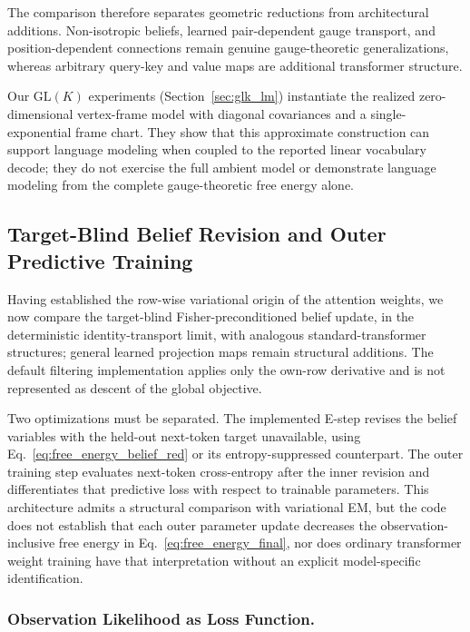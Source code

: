 \documentclass[twoside,11pt]{article}
\begin{document}
The comparison therefore separates geometric reductions from architectural additions. Non-isotropic beliefs, learned pair-dependent gauge transport, and position-dependent connections remain genuine gauge-theoretic generalizations, whereas arbitrary query-key and value maps are additional transformer structure.

Our $\mathrm{GL}(K)$ experiments (Section~\ref{sec:glk_lm}) instantiate the realized zero-dimensional vertex-frame model with diagonal covariances and a single-exponential frame chart. They show that this approximate construction can support language modeling when coupled to the reported linear vocabulary decode; they do not exercise the full ambient model or demonstrate language modeling from the complete gauge-theoretic free energy alone.

\subsection{Target-Blind Belief Revision and Outer Predictive Training}

Having established the row-wise variational origin of the attention weights, we now compare the target-blind Fisher-preconditioned belief update, in the deterministic identity-transport limit, with analogous standard-transformer structures; general learned projection maps remain structural additions. The default filtering implementation applies only the own-row derivative and is not represented as descent of the global objective.

Two optimizations must be separated. The implemented E-step revises the belief variables with the held-out next-token target unavailable, using Eq.~\eqref{eq:free_energy_belief_red} or its entropy-suppressed counterpart. The outer training step evaluates next-token cross-entropy after the inner revision and differentiates that predictive loss with respect to trainable parameters. This architecture admits a structural comparison with variational EM, but the code does not establish that each outer parameter update decreases the observation-inclusive free energy in Eq.~\eqref{eq:free_energy_final}, nor does ordinary transformer weight training have that interpretation without an explicit model-specific identification.

\subsubsection{Observation Likelihood as Loss Function.}
\end{document}
